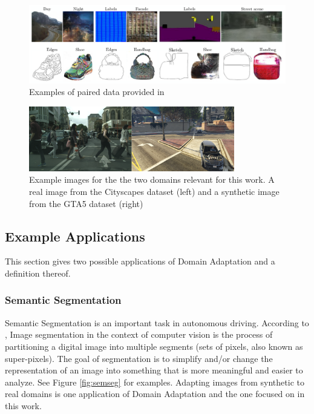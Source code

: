\begin{figure}
	\centering
	\includegraphics[width=\textwidth]{../images/paired_data.png}
	\caption{Examples of paired data provided in \cite{DBLP:journals/corr/IsolaZZE16}}
	\label{fig:paired_data}
\end{figure}

\begin{figure}
	\centering
	 \includegraphics[width=0.8\textwidth]{../images/DA_examples_cityscapes_gta.png}
	\caption{Example images for the the two domains relevant for this work. A real image from the Cityscapes dataset \cite{Cordts_2016_CVPR} (left) and a synthetic image from the GTA5 dataset \cite{Richter_2016_ECCV} (right)}
	\label{fig:DA_examples}
\end{figure}

\subsection{Example Applications}
This section gives two possible applications of Domain Adaptation and a definition thereof.

\subsubsection{Semantic Segmentation}
Semantic Segmentation is an important task in autonomous driving. According to \cite{Stockman:2001:CV:558008}, Image segmentation in the context of computer vision is the process of partitioning a digital image into multiple segments (sets of pixels, also known as super-pixels). The goal of segmentation is to simplify and/or change the representation of an image into something that is more meaningful and easier to analyze. See Figure \ref{fig:semseg} for examples. Adapting images from synthetic to real domains is one application of Domain Adaptation and the one focused on in this work. 


